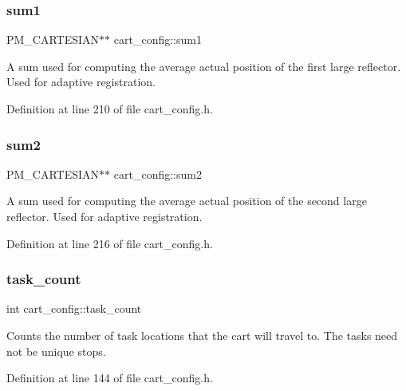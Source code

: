 \subsubsection{\texorpdfstring{sum1}{sum1}}
{\footnotesize\ttfamily P\+M\+\_\+\+C\+A\+R\+T\+E\+S\+I\+AN$\ast$$\ast$ cart\+\_\+config\+::sum1\hspace{0.3cm}{\ttfamily [private]}}

A sum used for computing the average actual position of the first large reflector. Used for adaptive registration. 

Definition at line 210 of file cart\+\_\+config.\+h.

\mbox{\label{classcart__config_aa45f914752bd0cdfa4d7473be5d15a78}} 
\subsubsection{\texorpdfstring{sum2}{sum2}}
{\footnotesize\ttfamily P\+M\+\_\+\+C\+A\+R\+T\+E\+S\+I\+AN$\ast$$\ast$ cart\+\_\+config\+::sum2\hspace{0.3cm}{\ttfamily [private]}}

A sum used for computing the average actual position of the second large reflector. Used for adaptive registration. 

Definition at line 216 of file cart\+\_\+config.\+h.

\mbox{\label{classcart__config_a54560028df17adebca7d034b3b246f45}} 
\subsubsection{\texorpdfstring{task\+\_\+count}{task\_count}}
{\footnotesize\ttfamily int cart\+\_\+config\+::task\+\_\+count\hspace{0.3cm}{\ttfamily [private]}}

Counts the number of task locations that the cart will travel to. The tasks need not be unique stops. 

Definition at line 144 of file cart\+\_\+config.\+h.

\mbox{\label{classcart__config_a68c64182da792f9eb4475705a228aae0}} 
